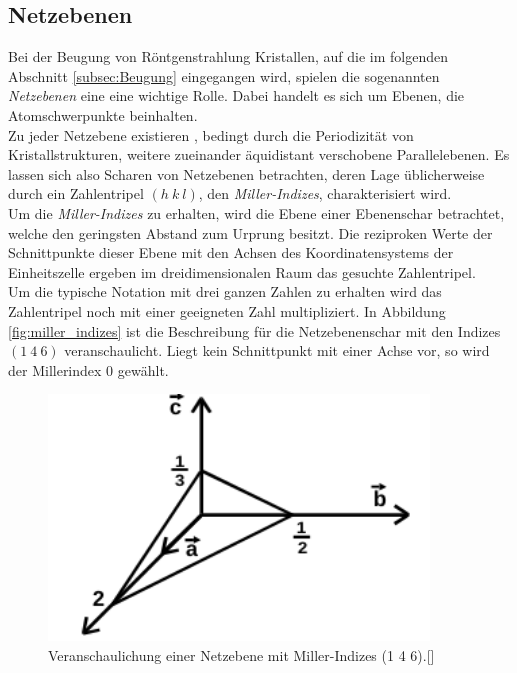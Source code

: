 \subsection{Netzebenen}
\label{subsec:netzebenen}
Bei der Beugung von Röntgenstrahlung Kristallen,
auf die im folgenden Abschnitt \ref{subsec:Beugung}
eingegangen wird, spielen die sogenannten \textit{Netzebenen}
eine eine wichtige Rolle. Dabei handelt es sich
um Ebenen, die Atomschwerpunkte beinhalten.\\
Zu jeder Netzebene existieren , bedingt durch die
Periodizität von Kristallstrukturen, weitere zueinander
äquidistant verschobene Parallelebenen.
Es lassen sich also Scharen von Netzebenen betrachten,
deren Lage üblicherweise durch ein Zahlentripel $(h \ k \ l)$,
den \textit{Miller-Indizes}, charakterisiert wird.\\
Um die \textit{Miller-Indizes} zu erhalten, wird die
Ebene einer Ebenenschar betrachtet, welche den geringsten
Abstand zum Urprung besitzt. Die reziproken Werte
der Schnittpunkte dieser Ebene mit den Achsen des
Koordinatensystems der Einheitszelle ergeben im
dreidimensionalen Raum das gesuchte Zahlentripel.\\
Um die typische Notation mit drei ganzen Zahlen zu erhalten
wird das Zahlentripel noch mit einer geeigneten Zahl
multipliziert. In Abbildung \ref{fig:miller_indizes}
ist die Beschreibung für die Netzebenenschar mit den
Indizes $(1 \ 4 \ 6)$ veranschaulicht.
Liegt kein Schnittpunkt mit einer
Achse vor, so wird der Millerindex $0$ gewählt.

\begin{figure}[hhh]
  \centering
  \includegraphics[width=0.9\textwidth]{abbildungen/miller_ind.png}
  \caption{Veranschaulichung einer Netzebene mit Miller-Indizes (1 4 6).[\cite{sample}]}
\end{figure}

